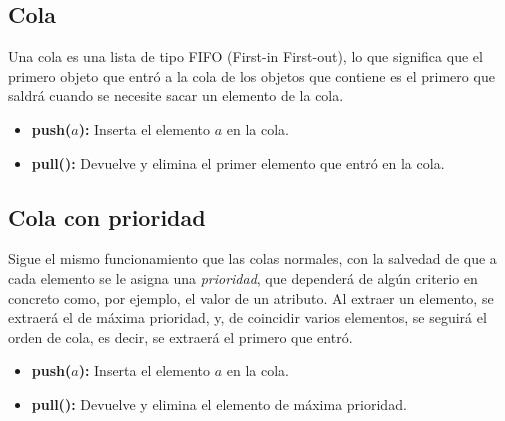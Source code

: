 \subsection{Cola}

Una cola es una lista de tipo FIFO (First-in First-out), lo que significa que el primero objeto que entró a la cola de los objetos que contiene es el primero que saldrá cuando se necesite sacar un elemento de la cola.

\begin{itemize}
	\item \textbf{push($a$):} Inserta el elemento $a$ en la cola.
	\item \textbf{pull():} Devuelve y elimina el primer elemento que entró en la cola.
\end{itemize}

\subsection{Cola con prioridad}
	
Sigue el mismo funcionamiento que las colas normales, con la salvedad de que a cada elemento se le asigna una \textit{prioridad}, que dependerá de algún criterio en concreto como, por ejemplo, el valor de un atributo. Al extraer un elemento, se extraerá el de máxima prioridad, y, de coincidir varios elementos, se seguirá el orden de cola, es decir, se extraerá el primero que entró.

\begin{itemize}
	\item \textbf{push($a$):} Inserta el elemento $a$ en la cola.
	\item \textbf{pull():} Devuelve y elimina el elemento de máxima prioridad.
\end{itemize}

		
\endinput



